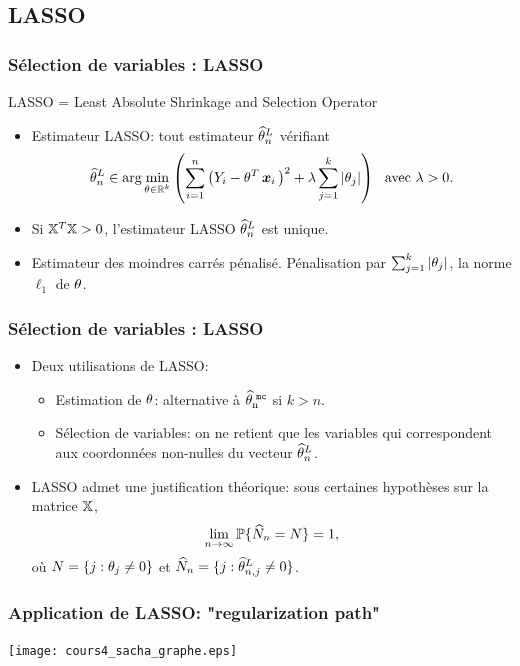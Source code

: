 \subsection{LASSO}

\begin{frame}
\frametitle{Sélection de variables : LASSO}

LASSO = Least Absolute Shrinkage and Selection Operator

\begin{itemize}
\item \alert{Estimateur LASSO}: tout estimateur $\widehat{\theta}^{L}_n$
vérifiant
$$\widehat\truetheta^{L}_n \in \arg \min_{\truetheta \in \R^k}\left(\sum_{i = 1}^n
\big(Y_i-\truetheta^T\bx_i\big)^2 + \lambda \sum_{j =
1}^k|\truetheta_j|\right) \ \ \text{avec} \ \lambda>0.
$$
\item Si $\mathbb{X}^T\mathbb{X}>0$, l'estimateur LASSO $\widehat{\theta}^{L}_n$ est unique.
\item Estimateur des moindres carrés \alert{pénalisé}.
Pénalisation par $\sum_{j = 1}^k|\theta_j|$, la norme $\ell_1$
de $\theta$.
\end{itemize}
\end{frame}

\begin{frame}
\frametitle{Sélection de variables : LASSO}
\begin{itemize}
\item Deux utilisations de
LASSO:
\begin{itemize}
\item \alert{Estimation de $\theta$}: alternative \`a
$\operatorname{\widehat \theta_n^{\,\,{\tt mc}}}$ si $k>n$.
\item \alert{Sélection de variables}: on ne retient que les
variables qui correspondent aux coordonnées non-nulles du vecteur
$\widehat{\theta}^{L}_n$.
\end{itemize}
\item LASSO admet une \alert{justification théorique}: sous certaines hypothèses sur la
matrice $\mathbb{X}$,
$$
\lim_{n\to\infty} \operatorname{{\mathbb P}}\{ \widehat N_n = N \} =1,
$$
o\`u $N= \{j: \theta_{j}\ne 0\}$ et $\widehat N_n= \{j:
\widehat{\theta}^{L}_{n,j}\ne 0\}$.
\end{itemize}
\end{frame}

\begin{frame}
    \frametitle{Application de LASSO: "regularization path"}
\begin{center}
\vspace{-1cm}
\texttt{[image: cours4\_sacha\_graphe.eps]}\hspace{3cm}
\end{center}
\end{frame}

